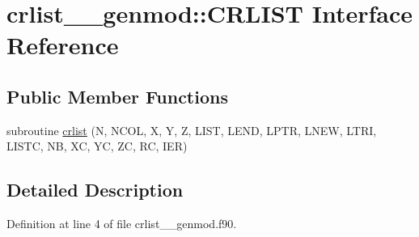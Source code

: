 \hypertarget{interfacecrlist____genmod_1_1CRLIST}{\section{crlist\+\_\+\+\_\+genmod\+:\+:C\+R\+L\+I\+S\+T Interface Reference}
\label{interfacecrlist____genmod_1_1CRLIST}
}
\subsection*{Public Member Functions}
\begin{DoxyCompactItemize}
\item 
subroutine \hyperlink{interfacecrlist____genmod_1_1CRLIST_a5315c5a72a047d4d0446e096b51b262e}{crlist} (N, N\+C\+O\+L, X, Y, Z, L\+I\+S\+T, L\+E\+N\+D, L\+P\+T\+R, L\+N\+E\+W, L\+T\+R\+I, L\+I\+S\+T\+C, N\+B, X\+C, Y\+C, Z\+C, R\+C, I\+E\+R)
\end{DoxyCompactItemize}


\subsection{Detailed Description}


Definition at line 4 of file crlist\+\_\+\+\_\+genmod.\+f90.



